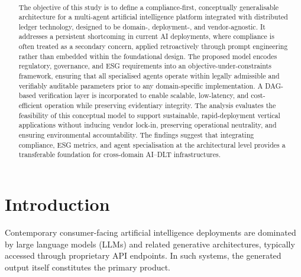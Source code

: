 \documentclass[oneside,10pt]{swissi}
\title{\papertitle \\[0.35em]
\normalsize \papersubtitle}
\author{{\fontsize{8}{10}\selectfont\paperauthors}\\[0.9em]
{\scriptsize\paperaffiliations}}
\date{\vspace{1.5em}}
\begin{document}
\maketitle

\begin{abstract}
The objective of this study is to define a compliance-first, conceptually generalisable architecture for a multi-agent artificial intelligence platform integrated with distributed ledger technology, designed to be domain-, deployment-, and vendor-agnostic. It addresses a persistent shortcoming in current AI deployments, where compliance is often treated as a secondary concern, applied retroactively through prompt engineering rather than embedded within the foundational design. The proposed model encodes regulatory, governance, and ESG requirements into an objective-under-constraints framework, ensuring that all specialised agents operate within legally admissible and verifiably auditable parameters prior to any domain-specific implementation. A DAG-based verification layer is incorporated to enable scalable, low-latency, and cost-efficient operation while preserving evidentiary integrity. The analysis evaluates the feasibility of this conceptual model to support sustainable, rapid-deployment vertical applications without inducing vendor lock-in, preserving operational neutrality, and ensuring environmental accountability. The findings suggest that integrating compliance, ESG metrics, and agent specialisation at the architectural level provides a transferable foundation for cross-domain AI–DLT infrastructures.
\end{abstract}


\bigskip

\section{Introduction}\label{sec1}

Contemporary consumer-facing artificial intelligence deployments are dominated by large language models (LLMs) and related generative architectures, typically accessed through proprietary API endpoints.\cite{aiindex2025economy,openai_api_models} In such systems, the generated output itself constitutes the primary product.\cite{aiindex2025economy}
\end{document}
